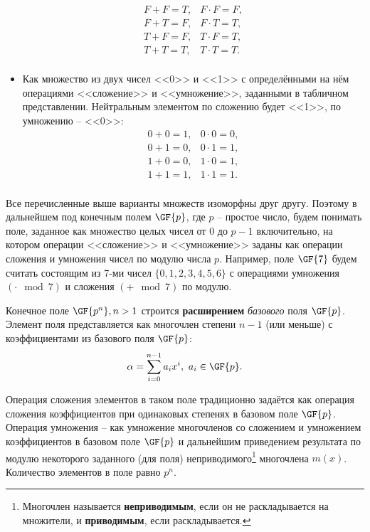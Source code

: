 \begin{itemize}
\[\begin{array}{ll}
	F + F = T,	& 	F \cdot F = F, \\
	F + T = F,	& 	F \cdot T = T, \\
	T + F = F,	& 	T \cdot F = T, \\
	T + T = T,	& 	T \cdot T = T. \\
\end{array}\]
	\item Как множество из двух чисел <<0>> и <<1>> с определёнными на нём операциями <<сложение>> и <<умножение>>, заданными в табличном представлении. Нейтральным элементом по сложению будет <<1>>, по умножению -- <<0>>:
\[\begin{array}{ll}
	0 + 0 = 1,	& 	0 \cdot 0 = 0, \\
	0 + 1 = 0,	& 	0 \cdot 1 = 1, \\
	1 + 0 = 0,	& 	1 \cdot 0 = 1, \\
	1 + 1 = 1,	& 	1 \cdot 1 = 1. \\
\end{array}\]
\end{itemize}

Все перечисленные выше варианты множеств изоморфны друг другу. Поэтому в дальнейшем под конечным полем $\GF{p}$, где $p$ -- простое число, будем понимать поле, заданное как множество целых чисел от $0$ до $p-1$ включительно, на котором операции <<сложение>> и <<умножение>> заданы как операции сложения и умножения чисел по модулю числа $p$. Например, поле $\GF{7}$ будем считать состоящим из 7-ми чисел $\{0, 1, 2, 3, 4, 5, 6\}$ с операциями умножения $(\cdot \mod 7)$ и сложения $(+ \mod 7)$ по модулю.

Конечное поле $\GF{p^n}, n > 1$ строится \textbf{расширением} \emph{базового} поля $\GF{p}$. Элемент поля представляется как многочлен степени $n-1$ (или меньше) с коэффициентами из базового поля $\GF{p}$:
    \[ \alpha = \sum\limits_{i=0}^{n-1} a_i x^i, ~ a_i \in \GF{p}. \]

Операция сложения элементов в таком поле традиционно задаётся как операция сложения коэффициентов при одинаковых степенях в базовом поле $\GF{p}$. Операция умножения -- как умножение многочленов со сложением и умножением коэффициентов в базовом поле $\GF{p}$ и дальнейшим приведением результата по модулю некоторого заданного (для поля) неприводимого\footnote{Многочлен называется \textbf{неприводимым}, если он не раскладывается на множители, и \textbf{приводимым}, если раскладывается.} многочлена $m(x)$. Количество элементов в поле равно $p^n$.

